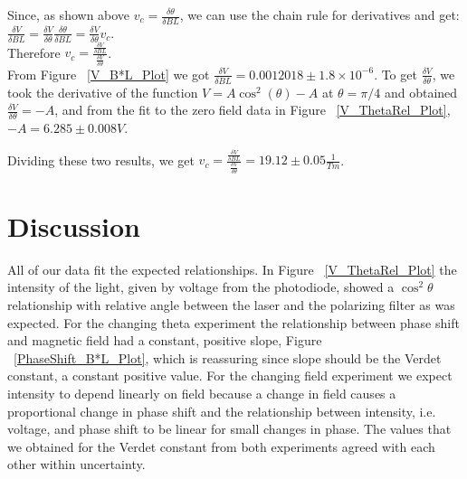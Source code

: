 \documentclass[prb,preprint]{revtex4-1}
\begin{document}
Since, as shown above $v_c = \frac{\delta \theta}{\delta BL}$, we can use the chain rule for derivatives and get: 
\\
$\frac{\delta V}{\delta BL} = \frac{\delta V}{\delta \theta} \frac{\delta \theta}{\delta BL} = \frac{\delta V}{\delta \theta} v_c$.  
\\
Therefore $v_c = \frac{\frac{\delta V}{\delta BL}}{\frac{\delta V}{\delta \theta}}$.
\\
From Figure ~\ref{V_B*L_Plot} we got $\frac{\delta V}{\delta BL} = 0.0012018 \pm 1.8 \times 10^{-6}$. To get $\frac{\delta V}{\delta \theta}$, we took the derivative of the function $V = A \cos^{2}(\theta) - A$ at $\theta = \pi/4$ and obtained $\frac{\delta V}{\delta \theta} = -A$, and from the fit to the zero field data in Figure ~\ref{V_ThetaRel_Plot}, $-A = 6.285 \pm 0.008 V$.  

Dividing these two results, we get $v_c = \frac{\frac{\delta V}{\delta BL}}{\frac{\delta V}{\delta \theta}} = 19.12 \pm 0.05 \frac{1}{Tm}$.  





\section{Discussion}

All of our data fit the expected relationships. In Figure ~\ref{V_ThetaRel_Plot} the intensity of the light, given by voltage from the photodiode, showed a $\cos^2\theta$ relationship with relative angle between the laser and the polarizing filter as was expected. For the changing theta experiment the relationship between phase shift and magnetic field had a constant, positive slope, Figure ~\ref{PhaseShift_B*L_Plot}, which is reassuring since slope should be the Verdet constant, a constant positive value.  For the changing field experiment we expect intensity to depend linearly on field because a change in field causes a proportional change in phase shift and the relationship between intensity, i.e. voltage, and phase shift to be linear for small changes in phase. The values that we obtained for the Verdet constant from both experiments agreed with each other within uncertainty. 
\end{document}
